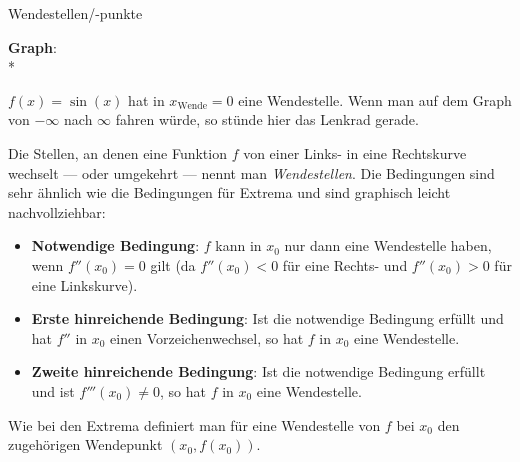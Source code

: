 \begin{bla}{Wendestellen/-punkte}
  \begin{marginfigure}
    \begin{tcolorbox}[colback=white!95!black,colframe=white!75!black,title=CAS:,arc=0mm]
      \begin{scriptsize}
        \textbf{Graph}: \\*
      \end{scriptsize}
    \end{tcolorbox}
  \end{marginfigure}

  \begin{marginfigure}
    \caption{$f(x)=\sin(x)$ hat in $x_{\text{Wende}}=0$ eine Wendestelle. Wenn man auf dem Graph von $-\infty$ nach $\infty$ fahren würde, so stünde hier das Lenkrad gerade.}
  \end{marginfigure}

  Die Stellen, an denen eine Funktion $f$ von einer Links- in eine Rechtskurve wechselt --- oder umgekehrt --- nennt man \emph{Wendestellen}. Die Bedingungen sind sehr ähnlich wie die Bedingungen für Extrema und sind graphisch leicht nachvollziehbar:
  \begin{itemize}
    \item \textbf{Notwendige Bedingung}: $f$ kann in $x_0$ nur dann eine Wendestelle haben, wenn $f''(x_0)=0$ gilt (da $f''(x_0) < 0$ für eine Rechts- und $f''(x_0) > 0$ für eine Linkskurve).
    \item \textbf{Erste hinreichende Bedingung}: Ist die notwendige Bedingung erfüllt und hat $f''$ in $x_0$ einen Vorzeichenwechsel, so hat $f$ in $x_0$ eine Wendestelle.
    \item \textbf{Zweite hinreichende Bedingung}: Ist die notwendige Bedingung erfüllt und ist $f'''(x_0)\neq 0$, so hat $f$ in $x_0$ eine Wendestelle.
  \end{itemize}
  Wie bei den Extrema definiert man für eine Wendestelle von $f$ bei $x_0$ den zugehörigen Wendepunkt $(x_0,f(x_0))$.
\end{bla}

